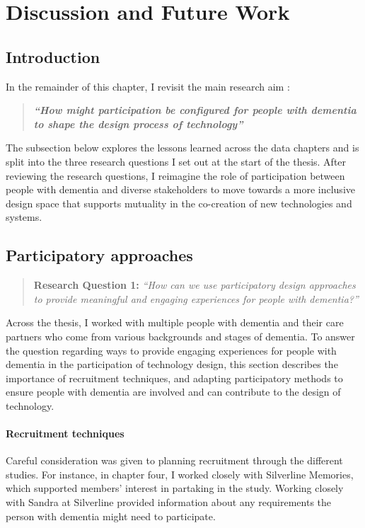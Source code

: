 \chapter{Discussion and Future Work}
\label{Discussion}

\section{Introduction}
\label{Discussion:Intro}
In the remainder of this chapter, I revisit the main research aim :
\begin{quote}
\textbf{\textit{``How might participation be configured for people with dementia to shape the design process of technology''}}
\end{quote}

The subsection below explores the lessons learned across the data chapters and is split into the three research questions I set out at the start of the thesis. After reviewing the research questions, I reimagine the role of participation between people with dementia and diverse stakeholders to move towards a more inclusive design space that supports mutuality in the co-creation of new technologies and systems. 

\section{Participatory approaches}
\label{Discussion:RQ1}
\begin{quote}
\textbf{    Research Question 1:
}    
\textit{    “How can we use participatory design approaches to provide meaningful and engaging experiences for people with dementia?”}
\end{quote}

Across the thesis, I worked with multiple people with dementia and their care partners who come from various backgrounds and stages of dementia. To answer the question regarding ways to provide engaging experiences for people with dementia in the participation of technology design, this section describes the importance of recruitment techniques, and adapting participatory methods to ensure people with dementia are involved and can contribute to the design of technology. 

\subsubsection{Recruitment techniques}
\label{RecruitmentTechniques}
Careful consideration was given to planning recruitment through the different studies. For instance, in chapter four, I worked closely with Silverline Memories, which supported members' interest in partaking in the study. Working closely with Sandra at Silverline provided information about any requirements the person with dementia might need to participate. 

